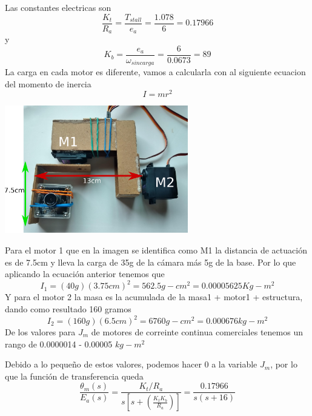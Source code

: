 Las constantes electricas son
\begin{equation}
	\frac{K_t}{R_a} = \frac{T_{stall}}{e_a} = \frac{1.078}{6} = 0.17966
\end{equation}
y
\begin{equation}
	K_b = \frac{e_a}{\omega_{sin carga}} = \frac{6}{0.0673} = 89
\end{equation}
La carga en cada motor es diferente, vamos a calcularla con al siguiente ecuacion del momento de inercia
\begin{equation}
	I = mr^2
\end{equation}
\begin{center}
	\includegraphics[width=0.6\textwidth]{Contenido/Cuerpo/Capitulo5/Fig20.eps}
	\label{Fig4}
\end{center}
Para el motor 1 que en la imagen se identifica como M1 la distancia de actuación es de 7.5cm y lleva la carga de 35g de la cámara más 5g de la base. Por lo que aplicando
la ecuación anterior tenemos que
\begin{equation}
	I_1 = (40g)(3.75cm)^2 = 562.5g-cm^2 = 0.00005625 Kg-m^2
\end{equation}
Y para el motor 2 la masa es la acumulada de la masa1 + motor1 + estructura, dando como resultado 160 gramos
\begin{equation}
	I_2 = (160g)(6.5cm)^2 = 6760 g-cm^2 = 0.000676 kg-m^2
\end{equation}
De los valores para $J_m$ de motores de correinte continua comerciales tenemos un rango de 0.0000014 - 0.00005 $kg-m^2$

Debido a lo pequeño de estos valores, podemos hacer 0 a la variable $J_m$, por lo que la función de transferencia queda
\begin{equation}
	\frac{\theta_m (s)}{E_a(s)} = \frac{K_t / R_a}{s \left[ s +  \left( \frac{K_tK_b}{R_a} \right) \right]} = \frac{0.17966}{s(s+16)}
\end{equation}

